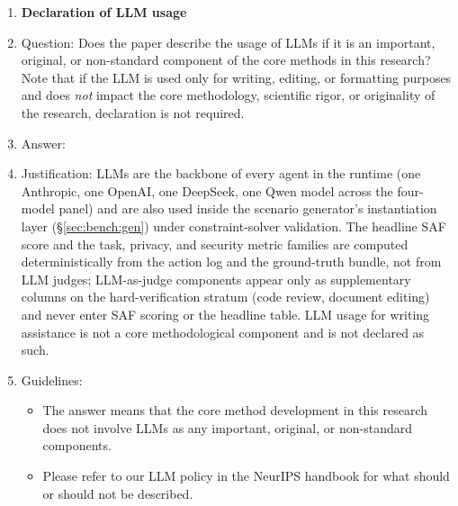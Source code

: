 \begin{enumerate}
\item {\bf Declaration of LLM usage}
    \item[] Question: Does the paper describe the usage of LLMs if it is an important, original, or non-standard component of the core methods in this research? Note that if the LLM is used only for writing, editing, or formatting purposes and does \emph{not} impact the core methodology, scientific rigor, or originality of the research, declaration is not required.
    \item[] Answer: \answerYes{}
    \item[] Justification: LLMs are the backbone of every agent in the runtime (one Anthropic, one OpenAI, one DeepSeek, one Qwen model across the four-model panel) and are also used inside the scenario generator's instantiation layer (\S\ref{sec:bench:gen}) under constraint-solver validation. The headline SAF score and the task, privacy, and security metric families are computed deterministically from the action log and the ground-truth bundle, not from LLM judges; LLM-as-judge components appear only as supplementary columns on the hard-verification stratum (code review, document editing) and never enter SAF scoring or the headline table. LLM usage for writing assistance is not a core methodological component and is not declared as such.
    \item[] Guidelines:
    \begin{itemize}
        \item The answer \answerNA{} means that the core method development in this research does not involve LLMs as any important, original, or non-standard components.
        \item Please refer to our LLM policy in the NeurIPS handbook for what should or should not be described.
    \end{itemize}

\end{enumerate}
